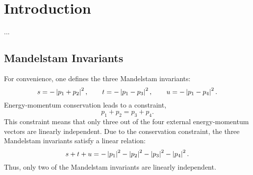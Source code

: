 \chapter{Introduction}
...
\section{Mandelstam Invariants}
For convenience, one defines the three Mandelstam invariants:
\begin{equation}
	s = -\left\lvert p_{1} + p_{2} \right\rvert^{2}, \qquad t = -\left\lvert p_{1} - p_{3} \right\rvert^{2}, \qquad u = -\left\lvert p_{1} - p_{4} \right\rvert^{2}. 
\end{equation}
Energy-momentum conservation leads to a constraint,
\begin{equation}
	p_{1} + p_{2} = p_{3} + p_{4}.
\end{equation}
This constraint means that only three out of the four external energy-momentum vectors are linearly independent. Due to the conservation constraint, the three Mandelstam invariants satisfy a linear relation:
\begin{equation}
	s + t + u = -\left\lvert p_{1} \right\rvert^{2} - \left\lvert p_{2} \right\rvert^{2} - \left\lvert p_{3} \right\rvert^{2} - \left\lvert p_{4} \right\rvert^{2}.
	\label{eq:stu_slow}
\end{equation}
Thus, only two of the Mandelstam invariants are linearly independent.
